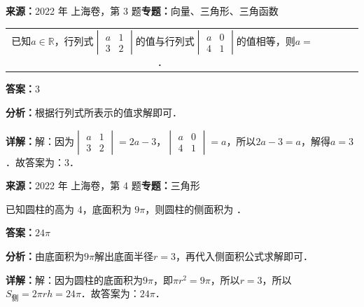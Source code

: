 \begin{question}[points=4]
\textbf{来源：}2022 年 上海卷，第 3 题\quad \textbf{专题：}向量、三角形、三角函数\par
\begin{center}

\begin{tabular}{ccccc}

已知$a \in \mathbb{R}$，行列式$\begin{vmatrix} a & 1 \\ 3 & 2 \end{vmatrix}$的值与行列式$\begin{vmatrix} a & 0 \\ 4 & 1 \end{vmatrix}$的值相等，则$a=$ ．

\end{tabular}

\end{center}
\fillin[{$3$}]
\begin{solution}
\textbf{答案：}$3$

\textbf{分析：}根据行列式所表示的值求解即可．

\textbf{详解：}解：因为$\begin{vmatrix} a & 1 \\ 3 & 2 \end{vmatrix}=2a-3$，$\begin{vmatrix} a & 0 \\ 4 & 1 \end{vmatrix}=a$，所以$2a-3=a$，解得$a=3$．故答案为：$3$．
\end{solution}
\end{question}

\begin{question}[points=4]
\textbf{来源：}2022 年 上海卷，第 4 题\quad \textbf{专题：}三角形\par
已知圆柱的高为 4，底面积为 $9\pi$，则圆柱的侧面积为 ．
\fillin[{$24\pi$}]
\begin{solution}
\textbf{答案：}$24\pi$

\textbf{分析：}由底面积为$9\pi$解出底面半径$r=3$，再代入侧面积公式求解即可．

\textbf{详解：}解：因为圆柱的底面积为$9\pi$，即$\pi r^2 =9\pi$，所以$r=3$，所以$S_{\text{侧}}=2\pi rh=24\pi$．故答案为：$24\pi$．
\end{solution}
\end{question}

